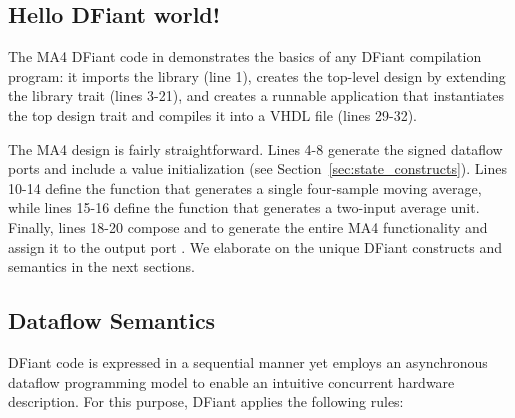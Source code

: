 \begin{table}[t!]
  \captionsetup{justification=centering}
\label{fig:MADraw}
\end{table}

\subsection{Hello DFiant world!}
The MA4 DFiant code in  demonstrates the basics of any DFiant compilation program: it imports the  library (line 1), creates the top-level design by extending the  library trait (lines 3-21), and creates a runnable application that instantiates the top design trait and compiles it into a VHDL file (lines 29-32). 

The MA4 design is fairly straightforward. Lines 4-8 generate the signed dataflow ports and include a  value initialization (see Section~\ref{sec:state_constructs}). 
Lines 10-14 define the function  that generates a single four-sample moving average, while lines 15-16 define the function  that generates a two-input average unit. Finally, lines 18-20 compose  and  to generate the entire MA4 functionality and assign it to the output port . We elaborate on the unique DFiant constructs and semantics in the next sections.


\subsection{Dataflow Semantics}
DFiant code is expressed in a sequential manner yet employs an asynchronous dataflow programming model to enable an intuitive concurrent hardware description. For this purpose, DFiant applies the following rules:

